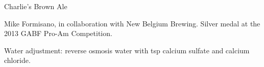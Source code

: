 \begin{recipe}{Charlie's Brown Ale} %

\begin{aboutblock}
Mike Formisano, in collaboration with New Belgium Brewing. Silver medal at the
2013 GABF Pro-Am Competition. \sourceaha
\end{aboutblock}


\begin{methodandtiming}

\begin{mashsteps}
\end{mashsteps}

\begin{fermentationsteps}
\end{fermentationsteps}

\begin{directions}
Water adjustment: reverse osmosis water with  tsp calcium sulfate
and  calcium chloride.
\end{directions}

\end{methodandtiming}

\recipebreak

\begin{ingredientsblock}

\begin{malts}
\end{malts}

\begin{hops}
\end{hops}


\end{ingredientsblock}

\end{recipe}

